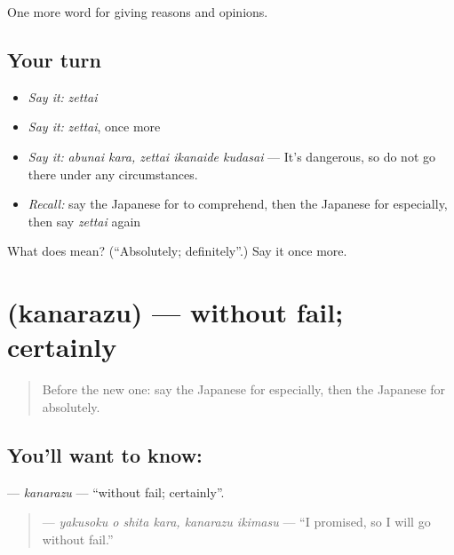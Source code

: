 \begin{grammarlens}[title={What you've built}]
One more word for giving reasons and opinions.
\end{grammarlens}

\subsection*{Your turn}
\begin{itemize}
\raggedright
  \item \emph{Say it:} \emph{zettai}
  \item \emph{Say it:} \emph{zettai}, once more
  \item \emph{Say it:} \emph{abunai kara, zettai ikanaide kudasai} — It's dangerous, so do not go there under any circumstances.
  \item \emph{Recall:} say the Japanese for to comprehend, then the Japanese for especially, then say \emph{zettai} again
\end{itemize}

\begin{tcolorbox}[breakable,colback=teal!4,colframe=teal!35!black,title={Before you move on}]
What does  mean? (\textquotedblleft{}Absolutely; definitely\textquotedblright{}.) Say it once more.
\end{tcolorbox}
\section[\texorpdfstring{\ja{かならず} (kanarazu)}{かならず (kanarazu)}]{ (kanarazu) — without fail; certainly}

\label{lesson:JA-C321-kanarazu}



\begin{quote}
Before the new one: say the Japanese for especially, then the Japanese for absolutely.
\end{quote}

\subsection*{You'll want to know: }
\textbf{} — \emph{kanarazu} — \textquotedblleft{}without fail; certainly\textquotedblright{}.

\begin{quote}
\textbf{  } — \emph{yakusoku o shita kara, kanarazu ikimasu} — \textquotedblleft{}I promised, so I will go without fail.\textquotedblright{}
\end{quote}


